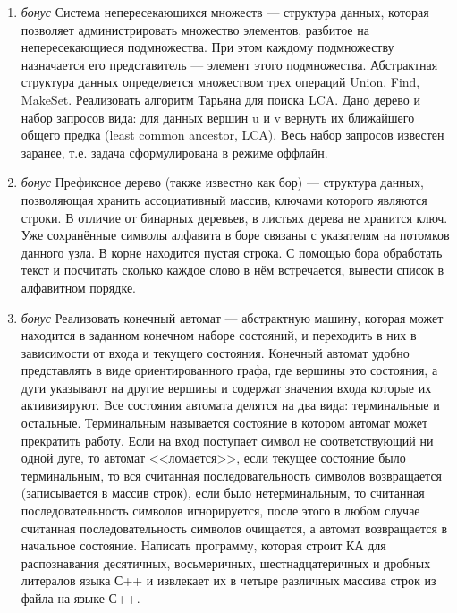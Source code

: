 \documentclass[12pt]{article}
\begin{document}
\begin{enumerate}
 \item \emph{бонус} Система непересекающихся множеств --- структура данных, которая позволяет администрировать 
множество элементов, разбитое на непересекающиеся подмножества. При этом каждому подмножеству назначается его 
представитель --- элемент этого подмножества. Абстрактная структура данных определяется множеством трех операций {Union, 
Find, MakeSet}. Реализовать алгоритм Тарьяна для поиска LCA. Дано дерево и набор запросов вида: для данных вершин u и v 
вернуть их ближайшего общего предка (least common ancestor, LCA). Весь набор запросов известен заранее, т.е. задача 
сформулирована в режиме оффлайн.
 \item \emph{бонус} Префиксное дерево (также известно как бор) --- структура данных, позволяющая хранить ассоциативный 
массив, ключами которого являются строки. В отличие от бинарных деревьев, в листьях дерева не хранится ключ. Уже 
сохранённые символы алфавита в боре связаны с указателям на потомков данного узла. В корне находится пустая строка. С 
помощью бора обработать текст и посчитать сколько каждое слово в нём встречается, вывести список в алфавитном порядке.
 \item \emph{бонус} Реализовать конечный автомат --- абстрактную машину, которая может находится в заданном конечном 
наборе состояний, и переходить в них в зависимости от входа и текущего состояния. Конечный автомат удобно представлять в 
виде ориентированного графа, где вершины это состояния, а дуги указывают на другие вершины и содержат значения входа 
которые их активизируют. Все состояния автомата делятся на два вида: терминальные и остальные. Терминальным называется 
состояние в котором автомат может прекратить работу. Если на вход поступает символ не соответствующий ни одной дуге, то 
автомат <<ломается>>, если текущее состояние было терминальным, то вся считанная последовательность символов 
возвращается (записывается в массив строк), если было нетерминальным, то считанная последовательность символов 
игнорируется, после этого в любом случае считанная последовательность символов очищается, а автомат возвращается в 
начальное состояние. Написать программу, которая строит КА для распознавания десятичных, восьмеричных, шестнадцатеричных 
и дробных литералов языка С++ и извлекает их в четыре различных массива строк из файла на языке С++. 
\end{enumerate}
\end{document}
